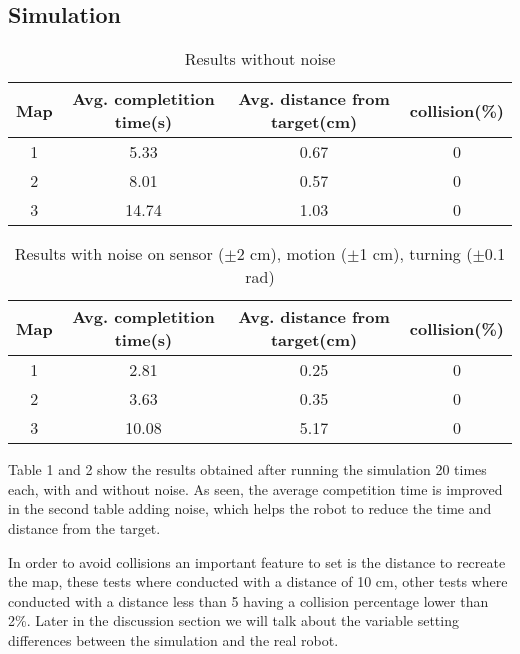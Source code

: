 \subsection{Simulation}
\begin{table}[h]
\begin{center}
	\begin{tabular}{ |c|c|c|c| }
		\hline
		Map & \multicolumn{1}{|p{3cm}|}{\centering Avg. completition time(s) } &\multicolumn{1}{|p{3cm}|}{\centering Avg. distance from target(cm) }  & collision(\%)  \\ 
		\hline
		\hline
		1 & 5.33 & 0.67 & 0 \\  
		2 & 8.01 & 0.57 & 0 \\ 
		3 & 14.74 & 1.03 & 0 \\ 
		\hline 
	\end{tabular}
	\caption{Results without noise}
	\label{table:nonoise}
\end{center}
\end{table}

\begin{table}[h]
\begin{center}
	\begin{tabular}{ |c|c|c|c| }
		\hline
		Map & \multicolumn{1}{|p{3cm}|}{\centering Avg. completition time(s) } &\multicolumn{1}{|p{3cm}|}{\centering Avg. distance from target(cm) }  & collision(\%)  \\ 
		\hline
		\hline
		1 & 2.81 & 0.25  & 0 \\  
		2 & 3.63 & 0.35  & 0 \\ 
		3 & 10.08 & 5.17  & 0 \\ 
		\hline 
	\end{tabular}
	\label{table:noise}
	\caption{Results with noise on sensor ($\pm$2 cm), motion ($\pm$1 cm), turning ($\pm$0.1 rad)}
\end{center}
\end{table}

Table 1 and 2 show the results obtained after running the simulation 20 times each, with and without noise. As seen, the average competition time is improved in the second table adding noise, which helps the robot to reduce the time and distance from the target. 

In order to avoid collisions an important feature to set is the distance to recreate the map, these tests where conducted with a distance of 10 cm, other tests where conducted with a distance less than 5 having a collision percentage lower than 2\%. Later in the discussion section we will talk about the variable setting differences between the simulation and the real robot. 

\FloatBarrier